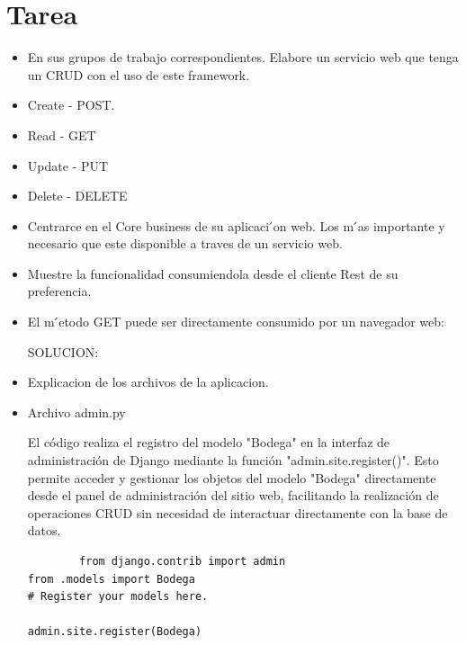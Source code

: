 \documentclass{article}
\begin{document}
	\section{Tarea}
	\begin{itemize}		

    \vspace{10mm}
    
        \item En sus grupos de trabajo correspondientes. Elabore un servicio web que tenga un CRUD con el
uso de este framework.
        \item Create - POST.
        \item Read - GET
        \item Update - PUT
        \item Delete - DELETE
        \item Centrarce en el Core business de su aplicaci ́on web. Los m ́as importante y necesario que este
disponible a traves de un servicio web.
        \item Muestre la funcionalidad consumiendola desde el cliente Rest de su preferencia.
        \item El m ́etodo GET puede ser directamente consumido por un navegador web:
        

        \vspace{200mm}
        
      
         
        SOLUCION:
        
        \vspace{10mm}
        \item Explicacion de los archivos de la aplicacion.
        
        \item Archivo admin.py
        
        El código realiza el registro del modelo "Bodega" en la interfaz de administración de Django mediante la función "admin.site.register()". Esto permite acceder y gestionar los objetos del modelo "Bodega" directamente desde el panel de administración del sitio web, facilitando la realización de operaciones CRUD sin necesidad de interactuar directamente con la base de datos.
        \begin{lstlisting}
        from django.contrib import admin
from .models import Bodega
# Register your models here.

admin.site.register(Bodega)

  \end{lstlisting}


\end{itemize}
\end{document}
